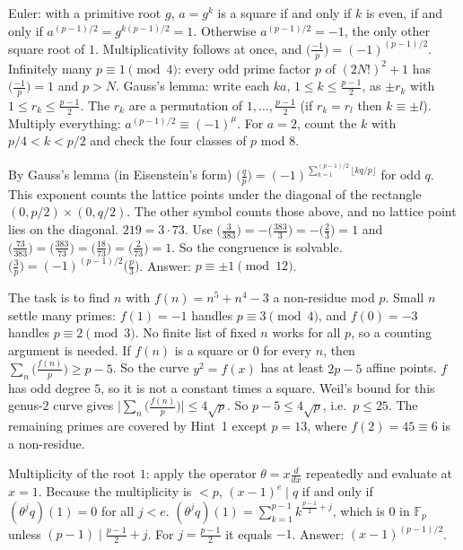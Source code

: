 \documentclass[11pt,a4paper]{article}
\begin{document}

 Euler: with a primitive root $g$, $a=g^k$ is a square if and only if $k$ is even, if and only if $a^{(p-1)/2}=g^{k(p-1)/2}=1$. Otherwise $a^{(p-1)/2}=-1$, the only other square root of $1$. Multiplicativity follows at once, and $\bigl(\frac{-1}p\bigr)=(-1)^{(p-1)/2}$.
 Infinitely many $p\equiv1\pmod 4$: every odd prime factor $p$ of $(2N!)^2+1$ has $\bigl(\frac{-1}{p}\bigr)=1$ and $p>N$.
 Gauss's lemma: write each $ka$, $1\le k\le\frac{p-1}2$, as $\pm r_k$ with $1\le r_k\le\frac{p-1}2$. The $r_k$ are a permutation of $1,\dots,\frac{p-1}2$ (if $r_k=r_l$ then $k\equiv\pm l$). Multiply everything: $a^{(p-1)/2}\equiv(-1)^\mu$. For $a=2$, count the $k$ with $p/4<k<p/2$ and check the four classes of $p$ mod $8$.

 By Gauss's lemma (in Eisenstein's form) $\bigl(\frac qp\bigr)=(-1)^{\sum_{k=1}^{(p-1)/2}\lfloor kq/p\rfloor}$ for odd $q$. This exponent counts the lattice points under the diagonal of the rectangle $(0,p/2)\times(0,q/2)$. The other symbol counts those above, and no lattice point lies on the diagonal.
 $219=3\cdot73$. Use $\bigl(\frac3{383}\bigr)=-\bigl(\frac{383}3\bigr)=-\bigl(\frac23\bigr)=1$ and $\bigl(\frac{73}{383}\bigr)=\bigl(\frac{383}{73}\bigr)=\bigl(\frac{18}{73}\bigr)=\bigl(\frac2{73}\bigr)=1$. So the congruence is solvable.
 $\bigl(\frac3p\bigr)=(-1)^{(p-1)/2}\bigl(\frac p3\bigr)$. Answer: $p\equiv\pm1\pmod{12}$.

 The task is to find $n$ with $f(n)=n^5+n^4-3$ a non-residue mod $p$. Small $n$ settle many primes: $f(1)=-1$ handles $p\equiv3\pmod4$, and $f(0)=-3$ handles $p\equiv2\pmod 3$. No finite list of fixed $n$ works for all $p$, so a counting argument is needed.
 If $f(n)$ is a square or $0$ for every $n$, then $\sum_{n}\bigl(\frac{f(n)}p\bigr)\ge p-5$. So the curve $y^2=f(x)$ has at least $2p-5$ affine points.
 $f$ has odd degree $5$, so it is not a constant times a square. Weil's bound for this genus-$2$ curve gives $\bigl|\sum_n\bigl(\frac{f(n)}p\bigr)\bigr|\le4\sqrt p$. So $p-5\le4\sqrt p$, i.e.\ $p\le25$. The remaining primes are covered by Hint~1 except $p=13$, where $f(2)=45\equiv6$ is a non-residue.

 Multiplicity of the root $1$: apply the operator $\theta=x\frac{d}{dx}$ repeatedly and evaluate at $x=1$. Because the multiplicity is $<p$, $(x-1)^e\mid q$ if and only if $(\theta^jq)(1)=0$ for all $j<e$.
 $(\theta^jq)(1)=\sum_{k=1}^{p-1}k^{\frac{p-1}2+j}$, which is $0$ in $\mathbb F_p$ unless $(p-1)\mid\frac{p-1}2+j$. For $j=\frac{p-1}{2}$ it equals $-1$. Answer: $(x-1)^{(p-1)/2}$.
\end{document}

